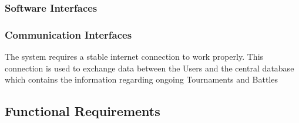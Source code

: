 \documentclass{article}
\begin{document}
\subsubsection{Software Interfaces}

\subsubsection{Communication Interfaces}
    The system requires a stable internet connection to work properly. This connection is used
    to exchange data between the Users and the central database which contains the information
regarding ongoing Tournaments and Battles
\subsection{Functional Requirements}
\end{document}

